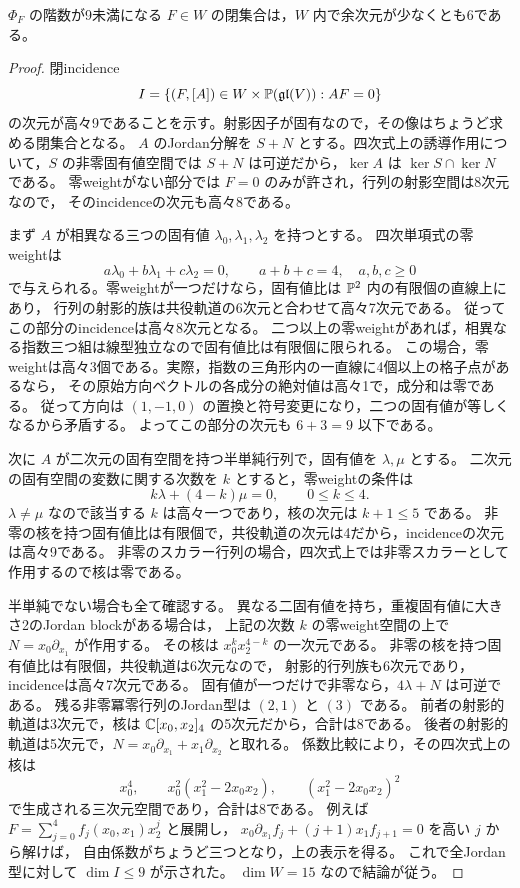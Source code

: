 \begin{lemma}[四次式の無限小安定化群の次元評価]
\label{lem:ku-quartic-stabilizer-codimension}
$\Phi_F$ の階数が9未満になる $F\in W$ の閉集合は，$W$ 内で余次元が少なくとも6である。
\end{lemma}
\begin{proof}
閉incidence
\[
 I=\{(F,[A])\in W\times\mathbb P(\mathfrak{gl}(V)):AF=0\}
\]
の次元が高々9であることを示す。射影因子が固有なので，その像はちょうど求める閉集合となる。
$A$ のJordan分解を $S+N$ とする。四次式上の誘導作用について，$S$ の非零固有値空間では
$S+N$ は可逆だから，$\ker A$ は $\ker S\cap\ker N$ である。
零weightがない部分では $F=0$ のみが許され，行列の射影空間は8次元なので，
そのincidenceの次元も高々8である。

まず $A$ が相異なる三つの固有値 $\lambda_0,\lambda_1,\lambda_2$ を持つとする。
四次単項式の零weightは
\[
 a\lambda_0+b\lambda_1+c\lambda_2=0,
 \qquad a+b+c=4,\quad a,b,c\ge0
\]
で与えられる。零weightが一つだけなら，固有値比は $\mathbb P^2$ 内の有限個の直線上にあり，
行列の射影的族は共役軌道の6次元と合わせて高々7次元である。
従ってこの部分のincidenceは高々8次元となる。
二つ以上の零weightがあれば，相異なる指数三つ組は線型独立なので固有値比は有限個に限られる。
この場合，零weightは高々3個である。実際，指数の三角形内の一直線に4個以上の格子点があるなら，
その原始方向ベクトルの各成分の絶対値は高々1で，成分和は零である。
従って方向は $(1,-1,0)$ の置換と符号変更になり，二つの固有値が等しくなるから矛盾する。
よってこの部分の次元も $6+3=9$ 以下である。

次に $A$ が二次元の固有空間を持つ半単純行列で，固有値を $\lambda,\mu$ とする。
二次元の固有空間の変数に関する次数を $k$ とすると，零weightの条件は
\[
 k\lambda+(4-k)\mu=0,\qquad 0\le k\le4.
\]
$\lambda\ne\mu$ なので該当する $k$ は高々一つであり，核の次元は $k+1\le5$ である。
非零の核を持つ固有値比は有限個で，共役軌道の次元は4だから，incidenceの次元は高々9である。
非零のスカラー行列の場合，四次式上では非零スカラーとして作用するので核は零である。

半単純でない場合も全て確認する。
異なる二固有値を持ち，重複固有値に大きさ2のJordan blockがある場合は，
上記の次数 $k$ の零weight空間の上で $N=x_0\partial_{x_1}$ が作用する。
その核は $x_0^kx_2^{4-k}$ の一次元である。
非零の核を持つ固有値比は有限個，共役軌道は6次元なので，
射影的行列族も6次元であり，incidenceは高々7次元である。
固有値が一つだけで非零なら，$4\lambda+N$ は可逆である。
残る非零冪零行列のJordan型は $(2,1)$ と $(3)$ である。
前者の射影的軌道は3次元で，核は $\mathbb C[x_0,x_2]_4$ の5次元だから，合計は8である。
後者の射影的軌道は5次元で，$N=x_0\partial_{x_1}+x_1\partial_{x_2}$ と取れる。
係数比較により，その四次式上の核は
\[
 x_0^4,\qquad x_0^2(x_1^2-2x_0x_2),\qquad
 (x_1^2-2x_0x_2)^2
\]
で生成される三次元空間であり，合計は8である。
例えば $F=\sum_{j=0}^4f_j(x_0,x_1)x_2^j$ と展開し，
$x_0\partial_{x_1}f_j+(j+1)x_1f_{j+1}=0$ を高い $j$ から解けば，
自由係数がちょうど三つとなり，上の表示を得る。
これで全Jordan型に対して $\dim I\le9$ が示された。
$\dim W=15$ なので結論が従う。
\end{proof}


